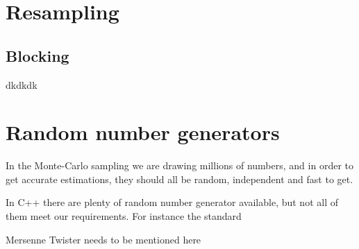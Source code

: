 \section{Resampling}
\subsection{Blocking}
dkdkdk



\section{Random number generators} \label{sec:RNG}
In the Monte-Carlo sampling we are drawing millions of numbers, and in order to get accurate estimations, they should all be random, independent and fast to get. 

In C++ there are plenty of random number generator available, but not all of them meet our requirements. For instance the standard 

Mersenne Twister needs to be mentioned here
